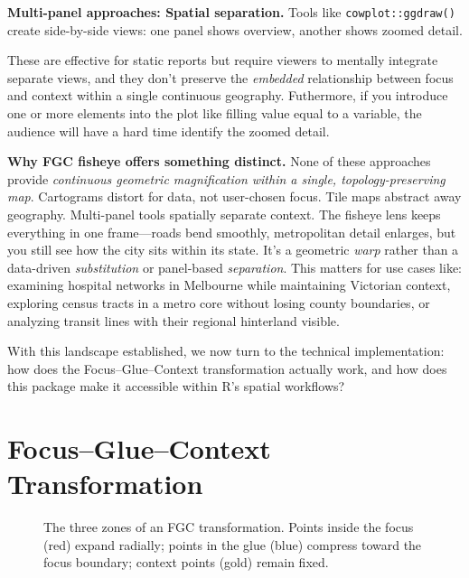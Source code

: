 \textbf{Multi-panel approaches: Spatial separation.} Tools like \texttt{cowplot::ggdraw()}\citep{cowplot} create side-by-side views: one panel shows overview, another shows zoomed detail.


These are effective for static reports but require viewers to mentally integrate separate views, and they don't preserve the \emph{embedded} relationship between focus and context within a single continuous geography. Futhermore, if you introduce one or more elements into the plot like filling value equal to a variable, the audience will have a hard time identify the zoomed detail.

\textbf{Why FGC fisheye offers something distinct.} None of these approaches provide \emph{continuous geometric magnification within a single, topology-preserving map}. Cartograms distort for data, not user-chosen focus. Tile maps abstract away geography. Multi-panel tools spatially separate context. The fisheye lens keeps everything in one frame---roads bend smoothly, metropolitan detail enlarges, but you still see how the city sits within its state. It's a geometric \emph{warp} rather than a data-driven \emph{substitution} or panel-based \emph{separation}. This matters for use cases like: examining hospital networks in Melbourne while maintaining Victorian context, exploring census tracts in a metro core without losing county boundaries, or analyzing transit lines with their regional hinterland visible.

With this landscape established, we now turn to the technical implementation: how does the Focus--Glue--Context transformation actually work, and how does this package make it accessible within R's spatial workflows?

\section{Focus--Glue--Context Transformation}\label{focusgluecontext-transformation}

\begin{figure}
\centering
{}
\caption{\label{fig:fgc-zones}The three zones of an FGC transformation. Points inside the focus (red) expand radially; points in the glue (blue) compress toward the focus boundary; context points (gold) remain fixed.}
\end{figure}

